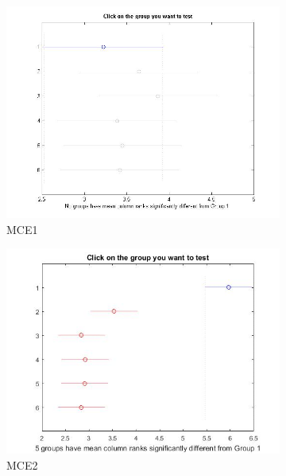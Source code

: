 \begin{figure}
	\centering
	\begin{subfigure}[b]{0.49\linewidth}
		\includegraphics[width=\linewidth]{Figures/Bonferroni_HNMED_VS_ED_P1}
		\caption{MCE1} \label{fig:Bon_M1} 
	\end{subfigure}
	\begin{subfigure}[b]{0.49\linewidth}
		\includegraphics[width=\textwidth]{Figures/Bonferroni_HNMED_VS_ED_P2}
		\caption{MCE2} \label{fig:Bon_M2} 
	\end{subfigure}
	\begin{subfigure}[b]{0.49\linewidth}

\end{subfigure}
\end{figure}
